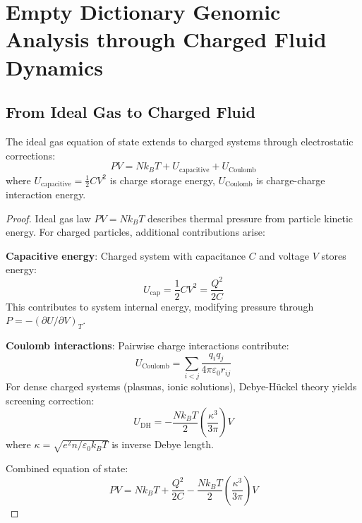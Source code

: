 \section{Empty Dictionary Genomic Analysis through Charged Fluid Dynamics}

\subsection{From Ideal Gas to Charged Fluid}

\begin{theorem}
\label{thm:charged_fluid_extension}
The ideal gas equation of state extends to charged systems through electrostatic corrections:
\begin{equation}
PV = Nk_BT + U_{\text{capacitive}} + U_{\text{Coulomb}}
\end{equation}
where $U_{\text{capacitive}} = \frac{1}{2}CV^2$ is charge storage energy, $U_{\text{Coulomb}}$ is charge-charge interaction energy.
\end{theorem}

\begin{proof}
Ideal gas law $PV = Nk_BT$ describes thermal pressure from particle kinetic energy. For charged particles, additional contributions arise:

\textbf{Capacitive energy}: Charged system with capacitance $C$ and voltage $V$ stores energy:
\begin{equation}
U_{\text{cap}} = \frac{1}{2}CV^2 = \frac{Q^2}{2C}
\end{equation}
This contributes to system internal energy, modifying pressure through $P = -(\partial U/\partial V)_T$.

\textbf{Coulomb interactions}: Pairwise charge interactions contribute:
\begin{equation}
U_{\text{Coulomb}} = \sum_{i<j} \frac{q_i q_j}{4\pi\varepsilon_0 r_{ij}}
\end{equation}
For dense charged systems (plasmas, ionic solutions), Debye-Hückel theory yields screening correction:
\begin{equation}
U_{\text{DH}} = -\frac{Nk_BT}{2}\left(\frac{\kappa^3}{3\pi}\right)V
\end{equation}
where $\kappa = \sqrt{e^2n/\varepsilon_0 k_BT}$ is inverse Debye length.

Combined equation of state:
\begin{equation}
PV = Nk_BT + \frac{Q^2}{2C} - \frac{Nk_BT}{2}\left(\frac{\kappa^3}{3\pi}\right)V
\end{equation}
\end{proof}

